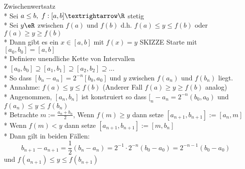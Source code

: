 %
\wdh
Zwischenwertsatz\\*
Sei $a\leq b,\ f:[a,b]→\R$ stetig\\*
Sei $y\eR$ zwischen $f(a)$ und $f(b)$ d.h. $f(a)\leq y\leq f(b)$ oder $f(a)\geq y\geq f(b)$\\*
Dann gibt es ein $x\in[a,b]$ mit $f(x)=y$ SKIZZE
Starte mit $[a_0,b_0]=[a,b]$\\*
Definiere unendliche Kette von Intervallen\\*
$[a_0,b_0]\supseteq [a_1,b_1]\supseteq [a_2,b_2]\supseteq …$\\*
So dass $[b_n-a_n]=2^{-n}[b_0,a_0]$ und $y$ zwischen $f(a_n)$ und $f(b_n)$ liegt.\\*
Annahme: $f(a)\leq y\leq f(b)$ (Anderer Fall $f(a)\geq y\geq f(b)$ analog)\\*
Angenommen, $[a_n,b_n]$ ist konstruiert so dass $[_n-a_n=2^{-n}(b_0,a_0)$ und $f(a_n)\leq y\leq f(b_n)$\\*
Betrachte $m:=\frac{a_n+b_n}{2}$, Wenn $f(m)\geq y$ dann setze $[a_{n+1},b_{n+1}]:=[a_n,m]$\\*
Wenn $f(m)<y$ dann setze $[a_{n+1},b_{n+1}]:=[m,b_n]$\\*
Dann gilt in beiden Fällen:
$$b_{n+1}-a_{n+1}=\frac{1}{2}(b_n-a_n)=2^{-1}·2^{-n}(b_0-a_0)=2^{-n-1}(b_0-a_0)$$
und $f(a_{n+1})\leq y\leq f(b_{n+1})$

